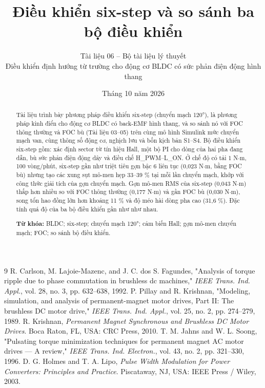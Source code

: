 \documentclass[11pt,a4paper]{article}
\title{\vspace{-1.2cm}\textbf{Điều khiển six-step và so sánh ba bộ điều khiển}}
\author{\normalsize Tài liệu 06 -- Bộ tài liệu lý thuyết\\[2pt]
\small Điều khiển định hướng từ trường cho động cơ BLDC có sức phản điện động hình thang}
\date{\small Tháng 10 năm 2026}
\begin{document}
\maketitle

\begin{abstract}
\noindent Tài liệu trình bày phương pháp điều khiển six-step (chuyển mạch 120°), là phương pháp kinh điển cho động cơ BLDC có back-EMF hình thang, và so sánh nó với FOC thông thường và FOC bù (Tài liệu 03–05) trên cùng mô hình Simulink mức chuyển mạch van, cùng thông số động cơ, nghịch lưu và bốn kịch bản S1–S4. Bộ điều khiển six-step gồm: xác định sector từ tín hiệu Hall, một bộ PI cho dòng của hai pha đang dẫn, bù sức phản điện động dây và điều chế H\_PWM–L\_ON. Ở chế độ có tải 1 N$\cdot$m, 100 vòng/phút, six-step gần như triệt tiêu gợn bậc 6 liên tục (0,023 N$\cdot$m, bằng FOC bù) nhưng tạo các xung sụt mô-men hẹp 33–39 \% tại mỗi lần chuyển mạch, khớp với công thức giải tích của gợn chuyển mạch. Gợn mô-men RMS của six-step (0,043 N$\cdot$m) thấp hơn nhiều so với FOC thông thường (0,177 N$\cdot$m) và gần FOC bù (0,030 N$\cdot$m), song tổn hao đồng lớn hơn khoảng 11 \% và độ méo hài dòng pha cao (31,6 \%). Đặc tính quá độ của ba bộ điều khiển gần như như nhau.

\vspace{0.5em}
\noindent\textbf{Từ khóa:} BLDC; six-step; chuyển mạch 120°; cảm biến Hall; gợn mô-men chuyển mạch; FOC; so sánh bộ điều khiển.
\end{abstract}


\tableofcontents
\newpage



\setcounter{section}{7}


\begin{thebibliography}{9}
\small
{} R. Carlson, M. Lajoie-Mazenc, and J. C. dos S. Fagundes, "Analysis of torque ripple due to phase commutation in brushless dc machines," \emph{IEEE Trans. Ind. Appl.}, vol. 28, no. 3, pp. 632–638, 1992.
 P. Pillay and R. Krishnan, "Modeling, simulation, and analysis of permanent-magnet motor drives, Part II: The brushless DC motor drive," \emph{IEEE Trans. Ind. Appl.}, vol. 25, no. 2, pp. 274–279, 1989.
 R. Krishnan, \emph{Permanent Magnet Synchronous and Brushless DC Motor Drives}. Boca Raton, FL, USA: CRC Press, 2010.
 T. M. Jahns and W. L. Soong, "Pulsating torque minimization techniques for permanent magnet AC motor drives — A review," \emph{IEEE Trans. Ind. Electron.}, vol. 43, no. 2, pp. 321–330, 1996.
 D. G. Holmes and T. A. Lipo, \emph{Pulse Width Modulation for Power Converters: Principles and Practice}. Piscataway, NJ, USA: IEEE Press / Wiley, 2003.
\end{thebibliography}
\end{document}
